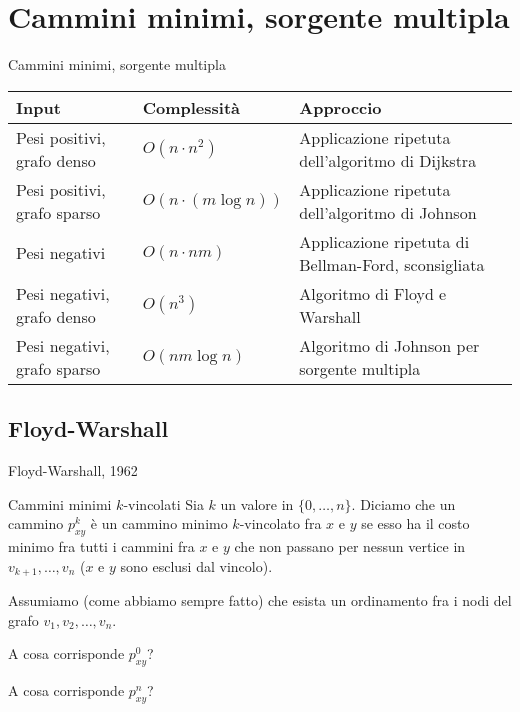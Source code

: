 \section{Cammini minimi, sorgente multipla}

\begin{frame}{Cammini minimi, sorgente multipla}


\medskip
\begingroup
\renewcommand*{\arraystretch}{1.2}
\small
\begin{tabular}{|P{2.3cm}|P{2.6cm}|P{5.8cm}|}
\hline
\textbf{Input} & \textbf{Complessità} & \textbf{Approccio} \\\hline
Pesi positivi, grafo denso & $O(n \cdot n^2)$ & Applicazione ripetuta dell'algoritmo di Dijkstra \\\hline
Pesi positivi, grafo sparso & $O(n \cdot (m \log n))$ & Applicazione ripetuta dell'algoritmo di Johnson \\\hline
Pesi negativi & $O(n \cdot nm)$ & Applicazione ripetuta di Bellman-Ford, \alert{sconsigliata} \\\hline
Pesi negativi, grafo denso & $O(n^3)$ & Algoritmo di \alert{Floyd e Warshall} \\\hline
Pesi negativi, grafo sparso & $O(nm \log n)$ & Algoritmo di \alert{Johnson per sorgente multipla} \\\hline
\end{tabular}
\endgroup

\end{frame}

\subsection{Floyd-Warshall}

\begin{frame}{Floyd-Warshall, 1962}

\begin{block}{Cammini minimi $k$-vincolati}
Sia $k$ un valore in $\{0,\ldots,n\}$. Diciamo che un cammino 
$p_{xy}^k$ è un \alert{cammino minimo $k$-vincolato} fra $x$ e $y$ 
se esso ha il costo minimo fra tutti i cammini fra $x$ e $y$ 
che non passano per nessun vertice in $v_{k+1}, \ldots, v_n$
($x$ e $y$ sono esclusi dal vincolo).
\end{block}

\bigskip
{}
Assumiamo (come abbiamo sempre fatto) che esista un ordinamento fra i nodi
del grafo $v_1, v_2, \ldots, v_n$.

\bigskip
{}
\BIL
\item A cosa corrisponde $p^0_{xy}$?
\item A cosa corrisponde $p^n_{xy}$?
\EIL

\end{frame}


